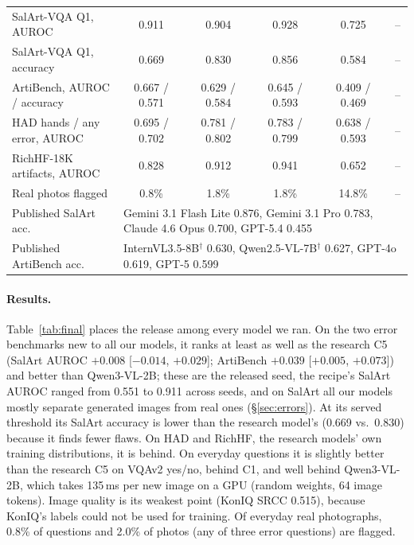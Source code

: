 \documentclass[10pt]{article}
\begin{document}
\begin{table}[t]
\begin{tabular}{lccccc}
SalArt-VQA Q1, AUROC & 0.911 & 0.904 & 0.928 & 0.725 & -- \\
SalArt-VQA Q1, accuracy & 0.669 & 0.830 & 0.856 & 0.584 & -- \\
ArtiBench, AUROC / accuracy & 0.667 / 0.571 & 0.629 / 0.584 & 0.645 / 0.593 & 0.409 / 0.469 & -- \\
HAD hands / any error, AUROC & 0.695 / 0.702 & 0.781 / 0.802 & 0.783 / 0.799 & 0.638 / 0.593 & -- \\
RichHF-18K artifacts, AUROC & 0.828 & 0.912 & 0.941 & 0.652 & -- \\
Real photos flagged & 0.8\% & 1.8\% & 1.8\% & 14.8\% & -- \\
\midrule
Published SalArt acc. & \multicolumn{5}{l}{Gemini 3.1 Flash Lite 0.876, Gemini 3.1 Pro 0.783, Claude 4.6 Opus 0.700, GPT-5.4 0.455} \\
Published ArtiBench acc. & \multicolumn{5}{l}{InternVL3.5-8B$^\dagger$ 0.630, Qwen2.5-VL-7B$^\dagger$ 0.627, GPT-4o 0.619, GPT-5 0.599} \\
\bottomrule
\end{tabular}
\end{table}

\paragraph{Results.} Table~\ref{tab:final} places the release among every model we ran. On the two error benchmarks new to all our models, it ranks at least as well as the research C5 (SalArt AUROC $+0.008$ [$-0.014$, $+0.029$]; ArtiBench $+0.039$ [$+0.005$, $+0.073$]) and better than Qwen3-VL-2B; these are the released seed, the recipe's SalArt AUROC ranged from 0.551 to 0.911 across seeds, and on SalArt all our models mostly separate generated images from real ones (\S\ref{sec:errors}). At its served threshold its SalArt accuracy is lower than the research model's (0.669 vs.\ 0.830) because it finds fewer flaws. On HAD and RichHF, the research models' own training distributions, it is behind. On everyday questions it is slightly better than the research C5 on VQAv2 yes/no, behind C1, and well behind Qwen3-VL-2B, which takes 135\,ms per new image on a GPU (random weights, 64 image tokens). Image quality is its weakest point (KonIQ SRCC 0.515), because KonIQ's labels could not be used for training. Of everyday real photographs, 0.8\% of questions and 2.0\% of photos (any of three error questions) are flagged.
\end{document}
